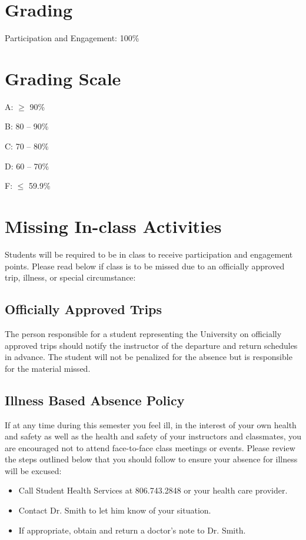 \documentclass[12pt, notitlepage]{article}   	%
\begin{document}
{\section{Grading}
Participation and Engagement: 100\% \par

\section{Grading Scale}
A: $\geq$ 90\% \par
B: 80 – 90\% \par
C: 70 – 80\% \par
D: 60 – 70\% \par
F: $\leq$ 59.9\% \par

\section{Missing In-class Activities}
Students will be required to be in class to receive participation and engagement points. 
Please read below if class is to be missed due to an officially approved trip, illness, or special circumstance:

\subsection{Officially Approved Trips}
The person responsible for a student representing the University on officially approved 
trips should notify the instructor of the departure and return schedules in advance.  
The student will not be penalized for the absence but is responsible for the material missed.

\subsection{Illness Based Absence Policy}
If at any time during this semester you feel ill, in the interest of your own health and 
safety as well as the health and safety of your instructors and classmates, you are 
encouraged not to attend face-to-face class meetings or events.  Please review the steps 
outlined below that you should follow to ensure your absence for illness will be excused:
\begin{itemize}
	\item{Call Student Health Services at 806.743.2848 or your health care provider.}
	\item{Contact Dr. Smith to let him know of your situation.}
	\item{If appropriate, obtain and return a doctor's note to Dr. Smith.}
\end{itemize}

}
\end{document}

